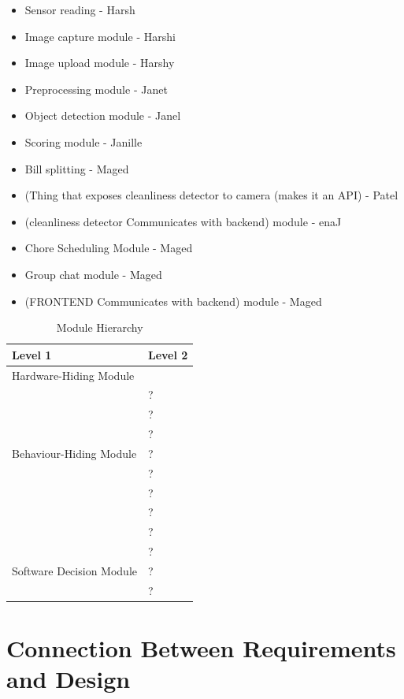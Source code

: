 \documentclass[12pt, titlepage]{article}
\begin{document}
\begin{itemize}
\item Sensor reading - Harsh
\item Image capture module - Harshi
\item Image upload module - Harshy
\item Preprocessing module - Janet
\item Object detection module - Janel
\item Scoring module - Janille
\item Bill splitting - Maged
\item (Thing that exposes cleanliness detector to camera (makes it an API) - Patel
\item (cleanliness detector Communicates with backend) module - enaJ
\item Chore Scheduling Module - Maged
\item Group chat module - Maged
\item (FRONTEND Communicates with backend) module - Maged

\end{itemize}
\begin{table}[h!]
\centering
\begin{tabular}{p{} p{}}
\toprule
\textbf{Level 1} & \textbf{Level 2}\\
\midrule

{Hardware-Hiding Module} & ~ \\
\midrule

\multirow{7}{0.3\textwidth}{Behaviour-Hiding Module} & ?\\
& ?\\
& ?\\
& ?\\
& ?\\
& ?\\
& ?\\ 
& ?\\
\midrule

\multirow{3}{0.3\textwidth}{Software Decision Module} & {?}\\
& ?\\
& ?\\
\bottomrule

\end{tabular}
\caption{Module Hierarchy}
\label{TblMH}
\end{table}

\section{Connection Between Requirements and Design} \label{SecConnection}
\end{document}
